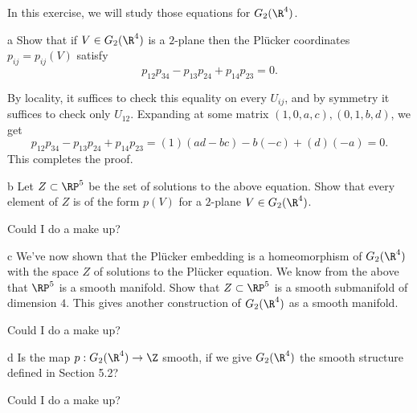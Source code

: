 \documentclass[11pt,letterpaper]{article}
\begin{document}
\begin{solution}
    In this exercise, we will study those equations for $G_2(\R^4)$.
    \begin{partproblem}{a}
        Show that if $V\in G_2(\R^4)$ is a $2$-plane then the Pl\"ucker coordinates $p_{ij} = p_{ij}(V)$ satisfy
        \[
            p_{12}p_{34} - p_{13}p_{24} + p_{14}p_{23} = 0 
        .\] 
    \end{partproblem}
    \quad By locality, it suffices to check this equality on every $U_{ij}$, and by symmetry it suffices to check only $U_{12}$. Expanding at some matrix $(1,0,a,c), (0,1,b,d)$, we get
    \[
        p_{12}p_{34} - p_{13}p_{24} + p_{14}p_{23} = (1)(ad-bc)-b(-c)+(d)(-a) = 0
    .\] 
    This completes the proof.

    \begin{partproblem}{b}
        Let $Z\subset \RP^5$ be the set of solutions to the above equation. Show that every element of $Z$ is of the form $p(V)$ for a $2$-plane $V\in G_2(\R^4)$.
    \end{partproblem}

    \quad Could I do a make up?

    \begin{partproblem}{c}
        We've now shown that the Pl\"ucker embedding is a homeomorphism of $G_2(\R^4)$ with the space $Z$ of solutions to the Pl\"ucker equation. We know from the above that $\RP^5$ is a smooth manifold. Show that $Z\subset \RP^5$ is a smooth submanifold of dimension $4$. %
        This gives another construction of $G_2(\R^4)$ as a smooth manifold.
    \end{partproblem}

    \quad Could I do a make up?

    \begin{partproblem}{d}
        Is the map $p : G_2(\R^4) \to \Z$ smooth, if we give $G_2(\R^4)$ the smooth structure defined in Section 5.2?
    \end{partproblem}
    
    \quad Could I do a make up?
\end{solution}
\end{document}
